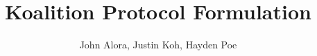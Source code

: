 \documentclass[a4paper, 11pt]{article}
\begin{document}
\title{Koalition Protocol Formulation}
\author{John Alora, Justin Koh, Hayden Poe}
\date{}
\maketitle

\begin{abstract}

\end{abstract}

\pagestyle{plain}

%
%
%
% 
%
%
\appendix


\end{document}
